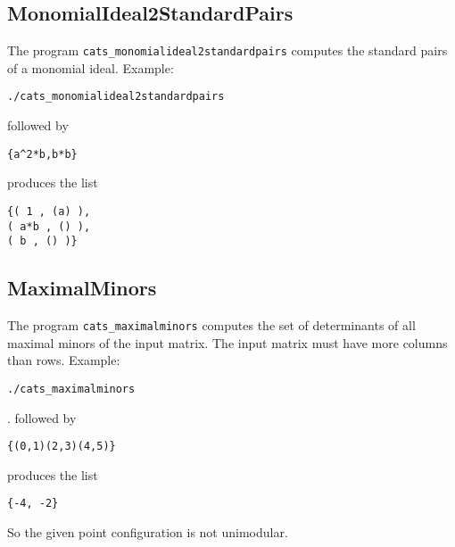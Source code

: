 \subsection{MonomialIdeal2StandardPairs}
\label{cats_monomialideal2standardpairs}
The program {\tt cats\_monomialideal2standardpairs} computes the
standard pairs of a monomial ideal.  Example:
\begin{verbatim}
./cats_monomialideal2standardpairs
\end{verbatim}
followed by
\begin{verbatim}
{a^2*b,b*b}
\end{verbatim}
produces the list
\begin{verbatim}
{( 1 , (a) ),
( a*b , () ),
( b , () )}
\end{verbatim}


\subsection{MaximalMinors}
\label{cats_maximalminors}
The program {\tt cats\_maximalminors} computes the set of determinants
of all maximal minors of the input matrix. The input matrix must have
more columns than rows.
Example:
\begin{verbatim}
./cats_maximalminors
\end{verbatim}.
followed by
\begin{verbatim}
{(0,1)(2,3)(4,5)}
\end{verbatim}
produces the list
\begin{verbatim}
{-4, -2}
\end{verbatim}
So the given point configuration is not unimodular.
